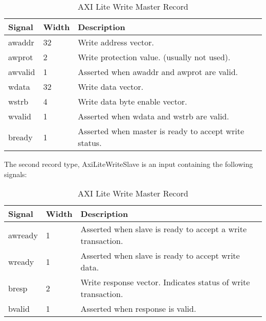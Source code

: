 \documentclass[11pt]{article}
\begin{document}
\begin{table}[H]
\small
\centering
   \begin{tabular}{| l | l | l | }
      \hline \textbf{Signal} & \textbf{Width}  & \textbf{Description} \\
      \hline awaddr          & 32              & Write address vector.                         \\
      \hline awprot          & 2               & Write protection value. (usually not used).    \\
      \hline awvalid         & 1               & Asserted when awaddr and awprot are valid.   \\
      \hline wdata           & 32              & Write data vector.                         \\
      \hline wstrb           & 4               & Write data byte enable vector.              \\
      \hline wvalid          & 1               & Asserted when wdata and wstrb are valid.   \\
      \hline bready          & 1               & Asserted when master is ready to accept write status. \\
      \hline
   \end{tabular}
   \caption{AXI Lite Write Master Record}
\end{table}

The second record type, AxiLiteWriteSlave is an input containing the following signals:

\begin{table}[H]
\small
\centering
   \begin{tabular}{| l | l | l | }
      \hline \textbf{Signal} & \textbf{Width}  & \textbf{Description} \\
      \hline awready         & 1               & Asserted when slave is ready to accept a write transaction. \\
      \hline wready          & 1               & Asserted when slave is ready to accept write data. \\
      \hline bresp           & 2               & Write response vector. Indicates status of write transaction. \\
      \hline bvalid          & 1               & Asserted when response is valid. \\
      \hline
   \end{tabular}
   \caption{AXI Lite Write Master Record}
\end{table}
\end{document}
